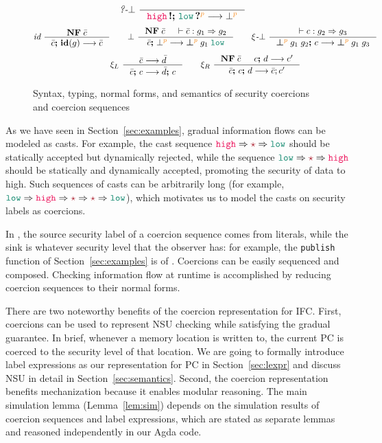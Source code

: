 \begin{figure}[tbp]
{\begin{gather*}
  \quad
  \textit{?-}\bot~
  \inference{}
            {\inj{\high} \seq \proj{\low}{p} \longrightarrow \bot^{\bl{p}}}
  \end{gather*}}
  {\small
  \begin{gather*}
  \textit{id}~
  \inference{\mathbf{NF}\; \bar{c}}
            {\bar{c} \seq \id{g} \longrightarrow \bar{c}}
  \qquad
  \bot~
  \inference{\mathbf{NF}\; \bar{c} & \vdash \bar{c} : g_1 \Rightarrow g_2}
            {\bar{c} \seq \bot^{\bl{p}} \longrightarrow \err{g_1}{\low}{p} }
  \qquad
  \xi\textit{-}\bot~
  \inference{\vdash c : g_2 \Rightarrow g_3}
    {\err{g_1}{g_2}{p} \seq c \longrightarrow \err{g_1}{g_3}{p}}
  \\[1ex]
  \xi_L~
  \inference{\bar{c} \longrightarrow \bar{d}}{\bar{c} \seq c \longrightarrow \bar{d} \seq c}
  \qquad
  \xi_R~
  \inference{\mathbf{NF}\; \bar{c} & c \seq d \longrightarrow c'}
            {\bar{c} \seq c \seq d \longrightarrow \bar{c}; c'}
  \end{gather*}}
  \caption{Syntax, typing, normal forms, and semantics of security coercions and coercion sequences}
  \label{fig:cexpr}
\end{figure}

As we have seen in Section~\ref{sec:examples}, gradual information flows can be
modeled as casts. For example, the cast sequence $\high \Rightarrow \unk
\Rightarrow \low$ should be statically accepted but dynamically rejected, while
the sequence $\low \Rightarrow \unk \Rightarrow \high$ should be statically and
dynamically accepted, promoting the security of data to high. Such sequences of
casts can be arbitrarily long (for example, $\low \Rightarrow \high \Rightarrow
\unk \Rightarrow \unk \Rightarrow \low$), which motivates us to model the casts
on security labels as coercions.

In \Surface, the source security label of a coercion sequence comes from
literals, while the sink is whatever security level that the observer has: for
example, the \texttt{publish} function of Section~\ref{sec:examples} is of \low.
Coercions can be easily sequenced and composed. Checking information flow at
runtime is accomplished by reducing coercion sequences to their normal forms.

There are two noteworthy benefits of the coercion representation for IFC. First,
coercions can be used to represent NSU checking while satisfying the gradual
guarantee. In brief, whenever a memory location is written to, the current PC is
coerced to the security level of that location. We are going to formally
introduce label expressions as our representation for PC in
Section~\ref{sec:lexpr} and discuss NSU in detail in
Section~\ref{sec:semantics}. Second, the coercion representation benefits
mechanization because it enables modular reasoning. The main simulation lemma
(Lemma~\ref{lem:sim}) depends on the simulation results of coercion sequences
and label expressions, which are stated as separate lemmas and reasoned
independently in our Agda code.

